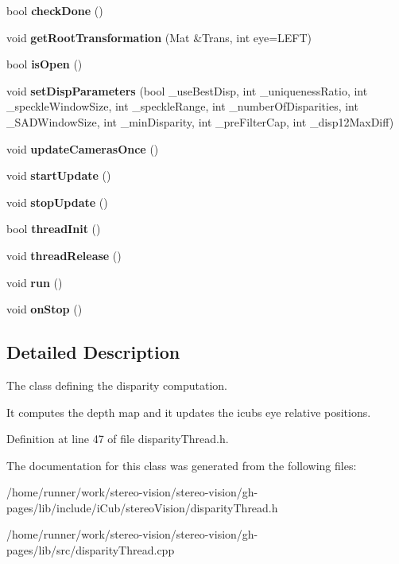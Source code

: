 \begin{DoxyCompactItemize}
\mbox{\label{classDisparityThread_ac4e45d17e21d68002ed8a3a979e7abab}} 
bool {\bfseries check\+Done} ()
\item 
\mbox{\label{classDisparityThread_a9300dc8b230296501c99032633daa0dc}} 
void {\bfseries get\+Root\+Transformation} (Mat \&Trans, int eye=L\+E\+FT)
\item 
\mbox{\label{classDisparityThread_af6afa37af0ff8dced127c760c016fe74}} 
bool {\bfseries is\+Open} ()
\item 
\mbox{\label{classDisparityThread_a7c03f103346967e4fe23c315a1ad2f95}} 
void {\bfseries set\+Disp\+Parameters} (bool \+\_\+use\+Best\+Disp, int \+\_\+uniqueness\+Ratio, int \+\_\+speckle\+Window\+Size, int \+\_\+speckle\+Range, int \+\_\+number\+Of\+Disparities, int \+\_\+\+S\+A\+D\+Window\+Size, int \+\_\+min\+Disparity, int \+\_\+pre\+Filter\+Cap, int \+\_\+disp12\+Max\+Diff)
\item 
\mbox{\label{classDisparityThread_afcfe2413bbbb52bd2e5737197f8c12b1}} 
void {\bfseries update\+Cameras\+Once} ()
\item 
\mbox{\label{classDisparityThread_a2b80cd97a2bd3f530afdb8615577c2c3}} 
void {\bfseries start\+Update} ()
\item 
\mbox{\label{classDisparityThread_a17f750f7e13366abb05f02ca0310ab91}} 
void {\bfseries stop\+Update} ()
\item 
\mbox{\label{classDisparityThread_a741ecfd39ec8b949997e38ab31e5908e}} 
bool {\bfseries thread\+Init} ()
\item 
\mbox{\label{classDisparityThread_a29bde42a3bfc24ff666e756febc42334}} 
void {\bfseries thread\+Release} ()
\item 
\mbox{\label{classDisparityThread_a88e71e25e8170fe009933cde0c494fca}} 
void {\bfseries run} ()
\item 
\mbox{\label{classDisparityThread_ad354c6f6ee5caba36aea07f66ffbc030}} 
void {\bfseries on\+Stop} ()
\end{DoxyCompactItemize}


\subsection{Detailed Description}
The class defining the disparity computation. 

It computes the depth map and it updates the icub\textquotesingle{}s eye relative positions. 

Definition at line 47 of file disparity\+Thread.\+h.



The documentation for this class was generated from the following files\+:\begin{DoxyCompactItemize}
\item 
/home/runner/work/stereo-\/vision/stereo-\/vision/gh-\/pages/lib/include/i\+Cub/stereo\+Vision/disparity\+Thread.\+h\item 
/home/runner/work/stereo-\/vision/stereo-\/vision/gh-\/pages/lib/src/disparity\+Thread.\+cpp\end{DoxyCompactItemize}

